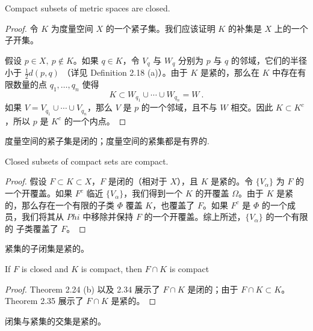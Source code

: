 \documentclass[../poma-notes.tex]{subfiles}
\begin{document}
\begin{theorem}
  Compact subsets of metric spaces are closed.
\end{theorem}

\begin{proof}
  令 $K$ 为度量空间 $X$ 的一个紧子集。我们应该证明 $K$ 的补集是 $X$ 上的一个子开集。

  假设 $p \in X,\ p \notin K$。如果 $q \in K$，令 $V_q$ 与 $W_q$ 分别为 $p$ 与 $q$ 的邻域，它们的半径小于 $\frac{1}{2}d(p,q)$
  （详见 Definition 2.18 (a)）。由于 $K$ 是紧的，那么在 $K$ 中存在有限数量的点 $q_1,\dots,q_n$ 使得
  \[K \subset W_{q_1} \cup \cdots \cup W_{q_n} = W\ .\]
  如果 $V = V_{q_1} \cup \cdots \cup V_{q_n}$，那么 $V$ 是 $p$ 的一个邻域，且不与 $W$ 相交。因此 $K \subset K^c$，所以 $p$ 是
  $K^c$ 的一个内点。
\end{proof}

\begin{anote}
  度量空间的紧子集是闭的；度量空间的紧集都是有界的.
\end{anote}


\begin{theorem}
  Closed subsets of compact sets are compact.
\end{theorem}

\begin{proof}
  假设 $F \subset K \subset X$，$F$ 是闭的（相对于 $X$），且 $K$ 是紧的。令 $\{V_{\alpha}\}$ 为 $F$ 的一个开覆盖。如果 $F^c$
  临近 $\{V_{\alpha}\}$，我们得到一个 $K$ 的开覆盖 $\Omega$。由于 $K$ 是紧的，那么存在一个有限的子类 $\Phi$ 覆盖 $K$，也覆盖了
  $F$。如果 $F^c$ 是 $\Phi$ 的一个成员，我们将其从 $Phi$ 中移除并保持 $F$ 的一个开覆盖。综上所述，$\{V_{\alpha}\}$ 的一个有限的
  子类覆盖了 $F$。
\end{proof}

\begin{anote}
  紧集的子闭集是紧的。
\end{anote}


\begin{corollary}
  If $F$ is closed and $K$ is compact, then $F \cap K$ is compact
\end{corollary}

\begin{proof}
  Theorem 2.24 (b) 以及 2.34 展示了 $F \cap K$ 是闭的；由于 $F \cap K \subset K$。Theorem 2.35 展示了 $F \cap K$ 是紧的。
\end{proof}

\begin{anote}
  闭集与紧集的交集是紧的。
\end{anote}
\end{document}
